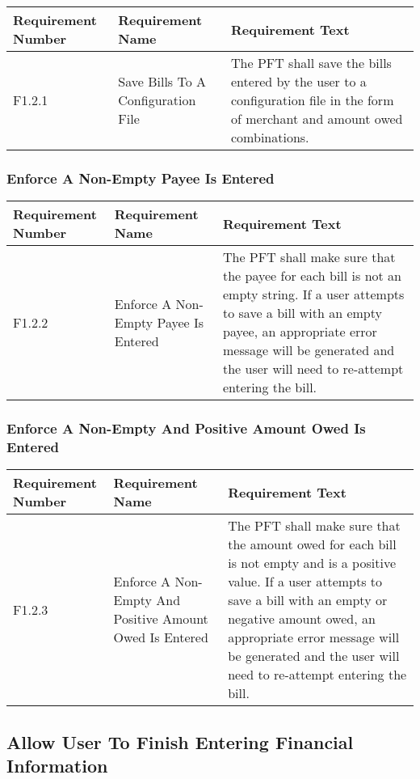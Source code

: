 \documentclass{article}
\begin{document}
\begin{longtable}{|p{2cm}|p{6cm}| p{6cm}|}
    \hline
    \textbf{Requirement Number} & \textbf{Requirement Name} & \textbf{Requirement Text}\\
    \hline
    F1.2.1 & Save Bills To A Configuration File & The PFT shall save the bills entered by the user to a configuration file in the form of merchant and amount owed combinations. \\
    \hline
\end{longtable}

\subsubsection{Enforce A Non-Empty Payee Is Entered}

\begin{longtable}{|p{2cm}|p{6cm}| p{6cm}|}
    \hline
    \textbf{Requirement Number} & \textbf{Requirement Name} & \textbf{Requirement Text}\\
    \hline
    F1.2.2 & Enforce A Non-Empty Payee Is Entered & The PFT shall make sure that the payee for each bill is not an empty string. If a user attempts to save a bill with an empty payee, an appropriate error message will be generated and the user will need to re-attempt entering the bill. \\
    \hline
\end{longtable}

\subsubsection{Enforce A Non-Empty And Positive Amount Owed Is Entered}

\begin{longtable}{|p{2cm}|p{6cm}| p{6cm}|}
    \hline
    \textbf{Requirement Number} & \textbf{Requirement Name} & \textbf{Requirement Text}\\
    \hline
    F1.2.3 & Enforce A Non-Empty And Positive Amount Owed Is Entered & The PFT shall make sure that the amount owed for each bill is not empty and is a positive value. If a user attempts to save a bill with an empty or negative amount owed, an appropriate error message will be generated and the user will need to re-attempt entering the bill. \\
    \hline
\end{longtable}

\subsection{Allow User To Finish Entering Financial Information}
\end{document}
